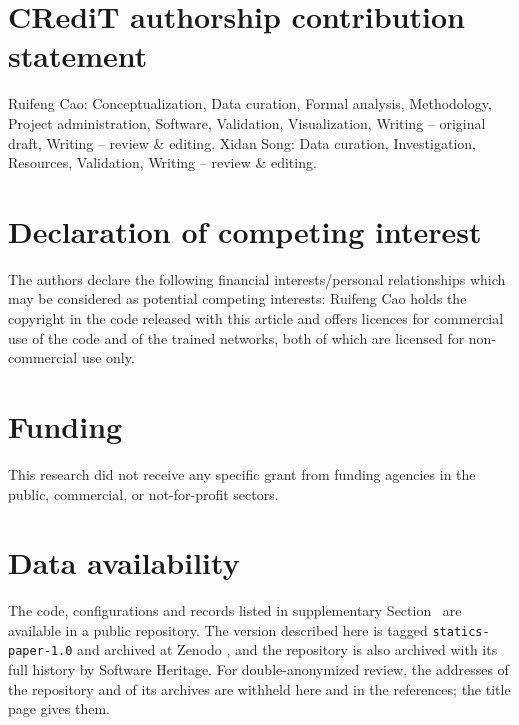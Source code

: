 \ifanonymous\else
\section*{CRediT authorship contribution statement}

Ruifeng Cao: Conceptualization, Data curation, Formal analysis, Methodology, Project
administration, Software, Validation, Visualization, Writing -- original draft, Writing --
review \& editing. Xidan Song: Data curation, Investigation, Resources, Validation,
Writing -- review \& editing.

\section*{Declaration of competing interest}

The authors declare the following financial interests/personal relationships which may be
considered as potential competing interests: Ruifeng Cao holds the copyright in the code
released with this article and offers licences for commercial use of the code and of the
trained networks, both of which are licensed for non-commercial use only.
\fi

\section*{Funding}

This research did not receive any specific grant from funding agencies in the public,
commercial, or not-for-profit sectors.

\section*{Data availability}

\ifanonymous
The code, configurations and records listed in supplementary Section~\SuppRepro{} are
available in a public repository. The version described here is tagged
\texttt{statics-paper-1.0} and archived at Zenodo \cite{Cao2026Zenodo}, and the repository
is also archived with its full history by Software Heritage. For double-anonymized review,
the addresses of the repository and of its archives are withheld here and in the
references; the title page gives them.

